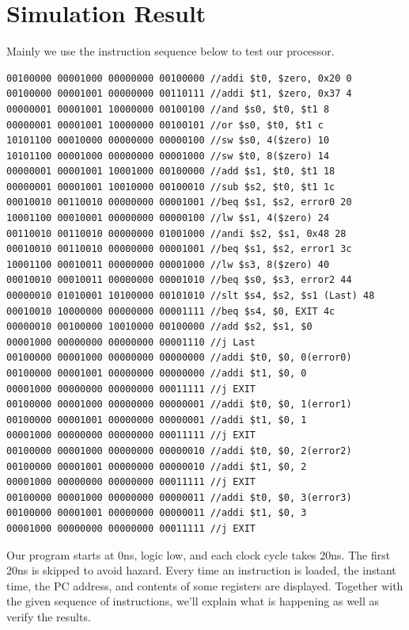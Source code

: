 \documentclass[a4paper,12pt]{article}
\begin{document}
\section{Simulation Result}
\par Mainly we use the instruction sequence below to test our processor.

\begin{lstlisting}
00100000 00001000 00000000 00100000 //addi $t0, $zero, 0x20 0
00100000 00001001 00000000 00110111 //addi $t1, $zero, 0x37 4
00000001 00001001 10000000 00100100 //and $s0, $t0, $t1 8 
00000001 00001001 10000000 00100101 //or $s0, $t0, $t1 c
10101100 00010000 00000000 00000100 //sw $s0, 4($zero) 10
10101100 00001000 00000000 00001000 //sw $t0, 8($zero) 14
00000001 00001001 10001000 00100000 //add $s1, $t0, $t1 18
00000001 00001001 10010000 00100010 //sub $s2, $t0, $t1 1c
00010010 00110010 00000000 00001001 //beq $s1, $s2, error0 20
10001100 00010001 00000000 00000100 //lw $s1, 4($zero) 24 
00110010 00110010 00000000 01001000 //andi $s2, $s1, 0x48 28
00010010 00110010 00000000 00001001 //beq $s1, $s2, error1 3c
10001100 00010011 00000000 00001000 //lw $s3, 8($zero) 40
00010010 00010011 00000000 00001010 //beq $s0, $s3, error2 44
00000010 01010001 10100000 00101010 //slt $s4, $s2, $s1 (Last) 48 
00010010 10000000 00000000 00001111 //beq $s4, $0, EXIT 4c
00000010 00100000 10010000 00100000 //add $s2, $s1, $0
00001000 00000000 00000000 00001110 //j Last
00100000 00001000 00000000 00000000 //addi $t0, $0, 0(error0)
00100000 00001001 00000000 00000000 //addi $t1, $0, 0
00001000 00000000 00000000 00011111 //j EXIT
00100000 00001000 00000000 00000001 //addi $t0, $0, 1(error1)
00100000 00001001 00000000 00000001 //addi $t1, $0, 1
00001000 00000000 00000000 00011111 //j EXIT
00100000 00001000 00000000 00000010 //addi $t0, $0, 2(error2)
00100000 00001001 00000000 00000010 //addi $t1, $0, 2
00001000 00000000 00000000 00011111 //j EXIT
00100000 00001000 00000000 00000011 //addi $t0, $0, 3(error3)
00100000 00001001 00000000 00000011 //addi $t1, $0, 3
00001000 00000000 00000000 00011111 //j EXIT
\end{lstlisting}

\par Our program starts at 0ns, logic low, and each clock cycle takes 20ns. The first 20ns is skipped to avoid hazard. Every time an instruction is loaded, the instant time, the PC address, and contents of some registers are displayed. Together with the given sequence of instructions, we'll explain what is happening as well as verify the results.
\end{document}
